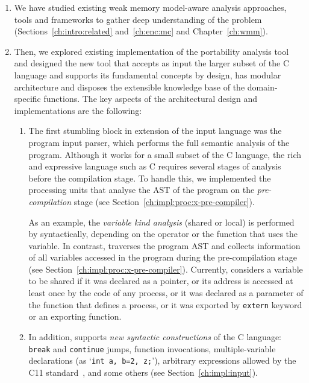 \begin{enumerate}[label=\arabic*.] %
\item
We have studied existing weak memory model-aware analysis approaches, tools and frameworks to gather deep understanding of the problem (Sections~\ref{ch:intro:related} and~\ref{ch:enc:mc} and Chapter~\ref{ch:wmm}).

\item
Then, we explored existing implementation of the portability analysis tool \textit{\porthos{}} and designed the new tool \textit{\porthos[2]} that accepts as input the larger subset of the C language and supports its fundamental concepts by design, has modular architecture and disposes the extensible knowledge base of the domain-specific functions.
The key aspects of the architectural design and implementations are the following:

  \begin{enumerate}[leftmargin=\parindent,label=\alph*.]
  \item The first stumbling block in extension of the input language was the \porthos[1] program input parser, which performs the full semantic analysis of the program.
  Although it works for a small subset of the C language, the rich and expressive language such as C requires several stages of analysis before the compilation stage.
  To handle this, we implemented the processing units that analyse the AST of the program on the \textit{pre-compilation} stage (see Section~\ref{ch:impl:proc:x-pre-compiler}).

  As an example, the \textit{variable kind analysis} (shared or local) is performed by \porthos[1] syntactically, depending on the operator or the function that uses the variable.
  In contrast, \porthos[2] traverses the program AST and collects information of all variables accessed in the program during the pre-compilation stage (see Section~\ref{ch:impl:proc:x-pre-compiler}).
  Currently, \porthos[2] considers a variable to be shared if it was declared as a pointer, or its address is accessed at least once by the code of any process, or it was declared as a parameter of the function that defines a process, or it was exported by \texttt{extern} keyword or an exporting function.

  \item In addition, \porthos[2] supports \textit{new syntactic constructions} of the C language: \texttt{break} and \texttt{continue} jumps, function invocations, multiple-variable declarations (as `\lstinline{int a, b=2, z;}'), arbitrary expressions allowed by the C11 standard~\cite{c11}, and some others (see Section~\ref{ch:impl:input}).


\end{enumerate}
\end{enumerate}
